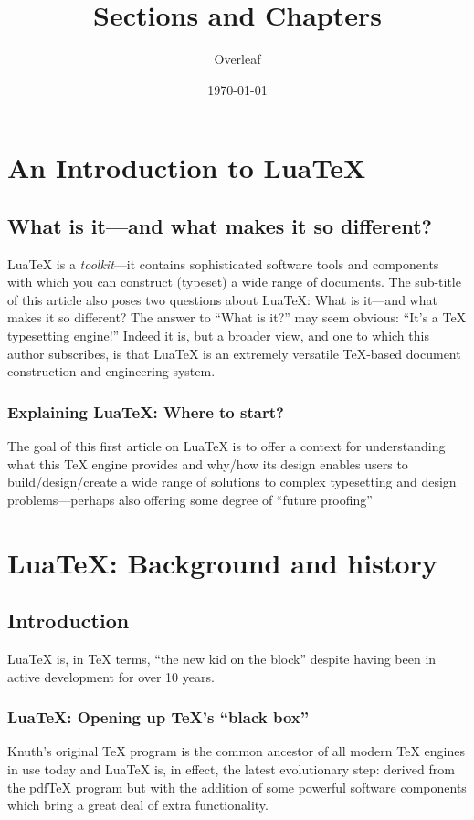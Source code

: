 \documentclass{report}
\title{Sections and Chapters}
\author{Overleaf}
\date{\today}
\begin{document}
\maketitle
\tableofcontents
\chapter{An Introduction to Lua\TeX}

\section{What is it—and what makes it so different?}
Lua\TeX{} is a \textit{toolkit}—it contains sophisticated software tools and components with which you can construct (typeset) a wide range of documents. The sub-title of this article also poses two questions about Lua\TeX: What is it—and what makes it so different? The answer to “What is it?” may seem obvious: “It’s a \TeX{} typesetting engine!” Indeed it is, but a broader view, and one to which this author subscribes, is that Lua\TeX{} is an extremely versatile \TeX-based document construction and engineering system.

\subsection{Explaining Lua\TeX: Where to start?}
The goal of this first article on Lua\TeX{} is to offer a context for understanding what this TeX engine provides and why/how its design enables users to build/design/create a wide range of solutions to complex typesetting and design problems—perhaps also offering some degree of “future proofing” 

\chapter{Lua\TeX: Background and history}
\section{Introduction}
Lua\TeX{} is, in \TeX{} terms, “the new kid on the block” despite having been in active development for over 10 years.

\subsection{Lua\TeX: Opening up \TeX’s “black box”}
Knuth’s original \TeX{} program is the common ancestor of all modern \TeX{} engines in use today and Lua\TeX{} is, in effect, the latest evolutionary step: derived from the pdf\TeX{} program but with the addition of some powerful software components which bring a great deal of extra functionality.
\end{document}
